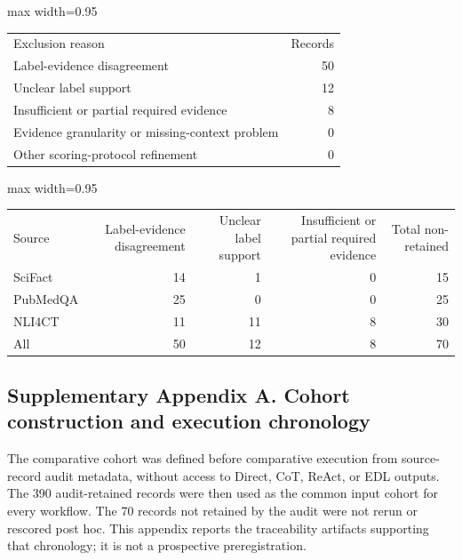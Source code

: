 \documentclass[
  8pt,
]{extarticle}
\begin{document}
\begin{center}
\begin{adjustbox}{max width=0.95\textwidth}
\begin{tabular}{@{}
lr@{}}
\toprule\noalign{}
Exclusion reason & Records \\

Label-evidence disagreement & 50 \\
Unclear label support & 12 \\
Insufficient or partial required evidence & 8 \\
Evidence granularity or missing-context problem & 0 \\
Other scoring-protocol refinement & 0 \\
\bottomrule
\end{tabular}
\end{adjustbox}
\end{center}

\begin{center}
\begin{adjustbox}{max width=0.95\textwidth}
\begin{tabular}{@{}
lrrrr@{}}
\toprule\noalign{}
Source & Label-evidence disagreement & Unclear label support &
Insufficient or partial required evidence & Total non-retained \\

SciFact & 14 & 1 & 0 & 15 \\
PubMedQA & 25 & 0 & 0 & 25 \\
NLI4CT & 11 & 11 & 8 & 30 \\
All & 50 & 12 & 8 & 70 \\
\bottomrule
\end{tabular}
\end{adjustbox}
\end{center}

\hypertarget{supplementary-appendix-a-cohort-construction-and-execution-chronology}{%
\subsection{Supplementary Appendix A. Cohort construction and execution
chronology}\label{supplementary-appendix-a-cohort-construction-and-execution-chronology}}

The comparative cohort was defined before comparative execution from
source-record audit metadata, without access to Direct, CoT, ReAct, or
EDL outputs. The 390 audit-retained records were then used as the common
input cohort for every workflow. The 70 records not retained by the
audit were not rerun or rescored post hoc. This appendix reports the
traceability artifacts supporting that chronology; it is not a
prospective preregistration.
\end{document}
